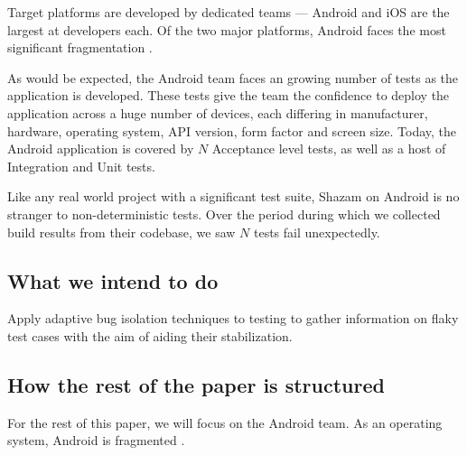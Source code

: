 Target platforms are developed by dedicated teams --- Android and iOS are the largest at  developers each. Of the two major platforms, Android faces the most significant fragmentation \cite{AndroidFragmentationVisualized}.

As would be expected, the Android team faces an growing number of tests as the application is developed.  These tests give the team the confidence to deploy the application across a huge number of devices, each differing in manufacturer, hardware, operating system, API version, form factor and screen size. Today, the Android application is covered by $N$  Acceptance level tests, as well as a host of Integration and Unit tests.

Like any real world project with a significant test suite, Shazam on Android is no stranger to non-deterministic tests. Over the period  during which we collected build results from their codebase, we saw $N$ tests fail unexpectedly.

\subsection{What we intend to do}

Apply adaptive bug isolation techniques to testing to gather information on flaky test cases with the aim of aiding their stabilization.

\subsection{How the rest of the paper is structured}

For the rest of this paper, we will focus on the Android team. As an operating system, Android is fragmented .